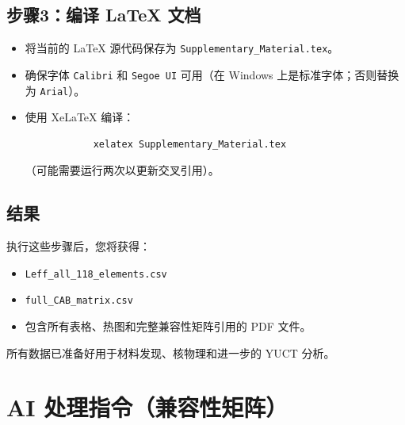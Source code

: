 \documentclass[11pt,a4paper]{article}
\begin{document}
	\subsection*{步骤3：编译 LaTeX 文档}
	\begin{itemize}
		\item 将当前的 LaTeX 源代码保存为 \texttt{Supplementary\_Material.tex}。
		\item 确保字体 \texttt{Calibri} 和 \texttt{Segoe UI} 可用（在 Windows 上是标准字体；否则替换为 \texttt{Arial}）。
		\item 使用 XeLaTeX 编译：
		\begin{verbatim}
			xelatex Supplementary_Material.tex
		\end{verbatim}
		（可能需要运行两次以更新交叉引用）。
	\end{itemize}
	
	\subsection*{结果}
	执行这些步骤后，您将获得：
	\begin{itemize}
		\item \texttt{Leff\_all\_118\_elements.csv}
		\item \texttt{full\_CAB\_matrix.csv}
		\item 包含所有表格、热图和完整兼容性矩阵引用的 PDF 文件。
	\end{itemize}
	所有数据已准备好用于材料发现、核物理和进一步的 YUCT 分析。
	
	\section*{AI 处理指令（兼容性矩阵）}
	\label{sec:ai_instructions}
	
\end{document}
